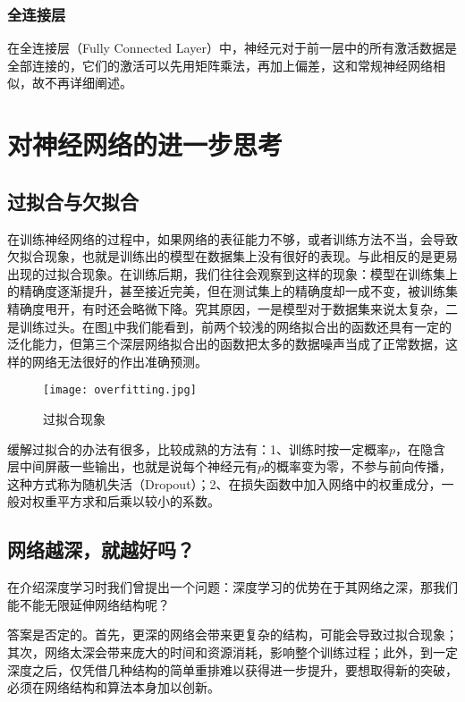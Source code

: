 \documentclass[bwprint]{cumcmthesis}
\begin{document}
\subsubsection{全连接层}

在全连接层（Fully Connected Layer）中，神经元对于前一层中的所有激活数据是全部连接的，它们的激活可以先用矩阵乘法，再加上偏差，这和常规神经网络相似，故不再详细阐述。





\section{对神经网络的进一步思考}

\subsection{过拟合与欠拟合}

在训练神经网络的过程中，如果网络的表征能力不够，或者训练方法不当，会导致欠拟合现象，也就是训练出的模型在数据集上没有很好的表现。与此相反的是更易出现的过拟合现象。在训练后期，我们往往会观察到这样的现象：模型在训练集上的精确度逐渐提升，甚至接近完美，但在测试集上的精确度却一成不变，被训练集精确度甩开，有时还会略微下降。究其原因，一是模型对于数据集来说太复杂，二是训练过头。在图\ref{overfitting}中我们能看到，前两个较浅的网络拟合出的函数还具有一定的泛化能力，但第三个深层网络拟合出的函数把太多的数据噪声当成了正常数据，这样的网络无法很好的作出准确预测。

\begin{figure}[!h]
	\centering
	\texttt{[image: overfitting.jpg]}
	\caption{过拟合现象\cite{cs231n}}
	\label{overfitting}
\end{figure}

缓解过拟合的办法有很多，比较成熟的方法有：1、训练时按一定概率$p$，在隐含层中间屏蔽一些输出，也就是说每个神经元有$p$的概率变为零，不参与前向传播，这种方式称为随机失活（Dropout）；2、在损失函数中加入网络中的权重成分，一般对权重平方求和后乘以较小的系数。

\subsection{网络越深，就越好吗？}

在介绍深度学习时我们曾提出一个问题：深度学习的优势在于其网络之深，那我们能不能无限延伸网络结构呢？

答案是否定的。首先，更深的网络会带来更复杂的结构，可能会导致过拟合现象；其次，网络太深会带来庞大的时间和资源消耗，影响整个训练过程；此外，到一定深度之后，仅凭借几种结构的简单重排难以获得进一步提升，要想取得新的突破，必须在网络结构和算法本身加以创新。
\end{document}
